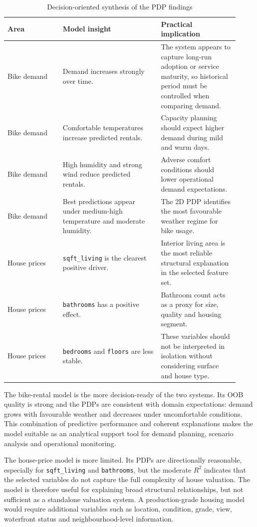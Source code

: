\documentclass[
]{article}
\begin{document}
\begin{table}[H]
\centering
\caption{Decision-oriented synthesis of the PDP findings}
\begin{tabular}{p{0.22\linewidth}p{0.39\linewidth}p{0.31\linewidth}}
\toprule
Area & Model insight & Practical implication \\
\midrule
Bike demand & Demand increases strongly over time. & The system appears to capture long-run adoption or service maturity, so historical period must be controlled when comparing demand. \\
Bike demand & Comfortable temperatures increase predicted rentals. & Capacity planning should expect higher demand during mild and warm days. \\
Bike demand & High humidity and strong wind reduce predicted rentals. & Adverse comfort conditions should lower operational demand expectations. \\
Bike demand & Best predictions appear under medium-high temperature and moderate humidity. & The 2D PDP identifies the most favourable weather regime for bike usage. \\
House prices & \texttt{sqft\_living} is the clearest positive driver. & Interior living area is the most reliable structural explanation in the selected feature set. \\
House prices & \texttt{bathrooms} has a positive effect. & Bathroom count acts as a proxy for size, quality and housing segment. \\
House prices & \texttt{bedrooms} and \texttt{floors} are less stable. & These variables should not be interpreted in isolation without considering surface and house type. \\
\bottomrule
\end{tabular}
\end{table}

The bike-rental model is the more decision-ready of the two systems. Its OOB quality is strong and the PDPs are consistent with domain expectations: demand grows with favourable weather and decreases under uncomfortable conditions. This combination of predictive performance and coherent explanations makes the model suitable as an analytical support tool for demand planning, scenario analysis and operational monitoring.

The house-price model is more limited. Its PDPs are directionally reasonable, especially for \texttt{sqft\_living} and \texttt{bathrooms}, but the moderate $R^2$ indicates that the selected variables do not capture the full complexity of house valuation. The model is therefore useful for explaining broad structural relationships, but not sufficient as a standalone valuation system. A production-grade housing model would require additional variables such as location, condition, grade, view, waterfront status and neighbourhood-level information.
\end{document}
